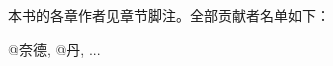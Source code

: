 \begin{titlepage}

\end{titlepage}
\newpage
\thispagestyle{empty}

\begin{center}
本书的各章作者见章节脚注。全部贡献者名单如下：

@奈德, @丹, ...


\end{center}

\setlength{\abovedisplayskip}{-5pt}
\setlength{\abovedisplayshortskip}{-5pt}